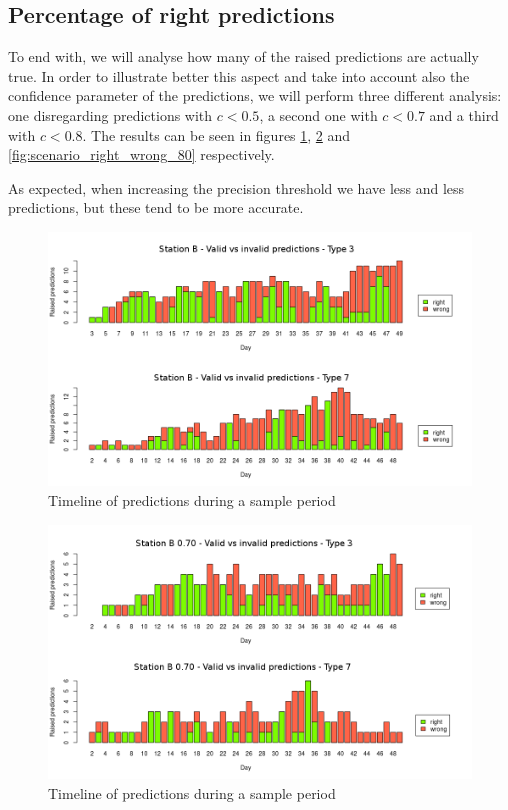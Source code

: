 \subsection{Percentage of right predictions}
To end with, we will analyse how many of the raised predictions are actually true. In order to illustrate better this aspect and take into account also the confidence parameter of the predictions, we will perform three different analysis: one disregarding predictions with $c < 0.5$, a second one with $c < 0.7$ and a third with $c < 0.8$. The results can be seen in figures \ref{fig:scenario_right_wrong}, \ref{fig:scenario_right_wrong_70} and \ref{fig:scenario_right_wrong_80} respectively.

As expected, when increasing the precision threshold we have less and less predictions, but these tend to be more accurate.

\begin{figure}[hbtp]
\includegraphics[width=\textwidth]{img/scenario_right_wrong.png}
\caption{Timeline of predictions during a sample period} \label{fig:scenario_right_wrong}
\end{figure}

\begin{figure}[hbtp]
\includegraphics[width=\textwidth]{img/scenario_right_wrong_70.png}
\caption{Timeline of predictions during a sample period} \label{fig:scenario_right_wrong_70}
\end{figure}

